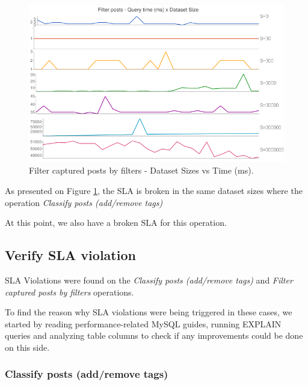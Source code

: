 \begin{figure}[ht!]
\centering
\includegraphics[width=120mm]{Imagens/filter-posts-query-time.png}
\caption{Filter captured posts by filters - Dataset Sizes vs Time (ms).\label{fig:filter-captured-posts-by-filters}}
\end{figure}

As presented on Figure \ref{fig:filter-captured-posts-by-filters}, the SLA is broken in the same dataset sizes where the operation \textit{Classify posts (add/remove tags)}

At this point, we also have a broken SLA for this operation. 























\clearpage
\subsection{Verify SLA violation}
SLA Violations were found on the \textit{Classify posts (add/remove tags)} and \textit{Filter captured posts by filters} operations. 

To find the reason why SLA violations were being triggered in these cases, we started by reading performance-related MySQL guides, running EXPLAIN queries and analyzing table columns to check if any improvements could be done on this side.

\subsubsection{Classify posts (add/remove tags)}

